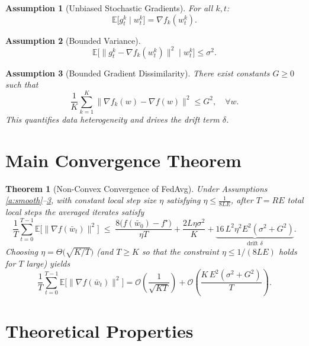 \documentclass[11pt]{article}
\newtheorem{theorem}{Theorem}
\newtheorem{assumption}{Assumption}
\begin{document}
\begin{assumption}[Unbiased Stochastic Gradients]\label{a:unbias}
For all $k,t$:
\[
\mathbb{E}\big[g_t^k \mid w_t^k\big] = \nabla f_k(w_t^k).
\]
\end{assumption}

\begin{assumption}[Bounded Variance]\label{a:var}
\[
\mathbb{E}\big[\|g_t^k - \nabla f_k(w_t^k)\|^2 \mid w_t^k\big] \le \sigma^2.
\]
\end{assumption}

\begin{assumption}[Bounded Gradient Dissimilarity]\label{a:diss}
There exist constants $G \ge 0$ such that
\[
\frac{1}{K}\sum_{k=1}^K \|\nabla f_k(w) - \nabla f(w)\|^2 \le G^2,
\quad \forall w.
\]
This quantifies data heterogeneity and drives the drift term $\delta$.
\end{assumption}

\section*{Main Convergence Theorem}

\begin{theorem}[Non-Convex Convergence of FedAvg]\label{thm:main}
Under Assumptions \ref{a:smooth}--\ref{a:diss}, with constant local step size
$\eta$ satisfying $\eta \le \frac{1}{8L E}$, after $T = RE$ total local steps
the averaged iterates satisfy
\[
\frac{1}{T}\sum_{t=0}^{T-1}
\mathbb{E}\big[\|\nabla f(\bar w_t)\|^2\big]
\;\le\;
\frac{8\big(f(\bar w_0) - f^\star\big)}{\eta T}
+ \frac{2L\eta \sigma^2}{K}
+ \underbrace{16\, L^2 \eta^2 E^2 (\sigma^2 + G^2)}_{\text{drift } \delta}.
\]
Choosing $\eta = \Theta\!\big(\sqrt{K/T}\big)$ (and $T\ge K$ so that the
constraint $\eta\le 1/(8LE)$ holds for $T$ large) yields
\[
\frac{1}{T}\sum_{t=0}^{T-1}
\mathbb{E}\big[\|\nabla f(\bar w_t)\|^2\big]
= \mathcal{O}\!\left(\frac{1}{\sqrt{KT}}\right)
+ \mathcal{O}\!\left(\frac{K\,E^2 (\sigma^2+G^2)}{T}\right).
\]
\end{theorem}

\section*{Theoretical Properties}
\end{document}
